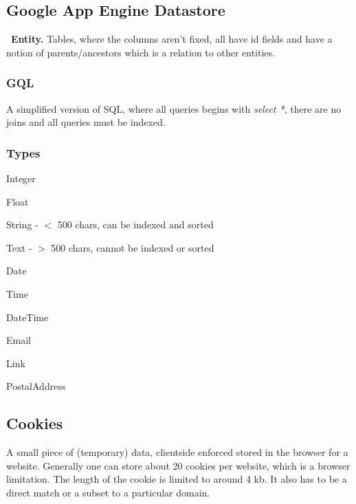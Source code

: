 \documentclass[12pt]{article}
\begin{document}


\subsection{Google App Engine Datastore}
\
\textbf{Entity.} Tables, where the columns aren't fixed, all have id fields and have a notion of parents/ancestors which is a relation to other entities.



\subsubsection{GQL}

A simplified version of SQL, where all queries begins with \emph{select *}, there are no joins and all queries must be indexed.



\subsubsection{Types}

\begin{list}{*}{
\setlength{\itemsep}{0pt}
\setlength{\parsep}{0pt}
\setlength{\topsep}{0pt}
\setlength{\partopsep}{0pt}
\setlength{\leftmargin}{2em}
\setlength{\labelwidth}{1.5em}
\setlength{\labelsep}{0.5em}
}
\item Integer
\item Float
\item String - $<$ 500 chars, can be indexed and sorted
\item Text - $>$ 500 chars, cannot be indexed or sorted
\item Date
\item Time
\item DateTime
\item Email
\item Link
\item PostalAddress
\end{list}



\subsection{Cookies}

A small piece of (temporary) data, clientside enforced stored in the browser for a website. Generally one can store about 20 cookies per website, which is a browser limitation. The length of the cookie is limited to around 4 kb. It also has to be a direct match or a subset to a particular domain.
\end{document}
